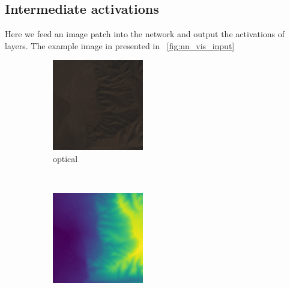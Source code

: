 \documentclass[11pt,a4paper]{article}
\begin{document}
\subsection{Intermediate activations}
Here we feed an image patch into the network and output the activations of layers. The example image in presented in \figurename~\ref{fig:nn_vis_input}
\begin{figure}[t]
    \centering
    \begin{subfigure}[b]{0.12\textwidth}
        \includegraphics[width=\textwidth]{graphics/nn_visualisation/input_image_0_2.png}
        \caption{optical}
    \end{subfigure}
    ~
    \begin{subfigure}[b]{0.12\textwidth}
        \includegraphics[width=\textwidth]{graphics/nn_visualisation/input_image_3.png}

\end{subfigure}
\end{figure}
\end{document}

